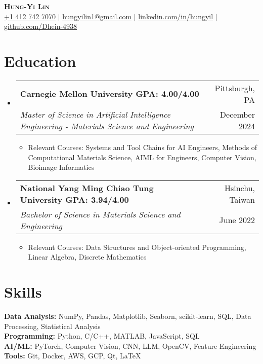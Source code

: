 \documentclass[a4paper,11pt]{article}
\makeatletter
\newcommand{\resumeItem}[1]{
  \item\small{
    {#1 \vspace{-2pt}}
  }
}
\newcommand{\resumeDoubleHeading}[4]{
  \vspace{-2pt}\item
    \begin{tabular*}{0.97\textwidth}[t]{l@{\extracolsep{\fill}}r}
        \textbf{#1} & #2 \\
        \textit{\small#3} & {\small #4} \\
    \end{tabular*}\vspace{-5pt}
}
\newcommand{\resumeSubHeadingListStart}{\begin{itemize}[leftmargin=0.15in, label={}]}
\newcommand{\resumeSubHeadingListEnd}{\end{itemize}}
\makeatother
\begin{document}

\begin{center}
    \textbf{\Huge \scshape Hung-Yi Lin} \\ \vspace{3pt}
    \small
    \faMobile \hspace{.5pt} \href{tel:14127427070}{+1 412 742 7070}
    $|$
    \faAt \hspace{.5pt} \href{mailto:hungyilin1@gmail.com}{hungyilin1@gmail.com}
    $|$
    \faLinkedinSquare \hspace{.5pt} \href{https://www.linkedin.com/in/hungyil}{linkedin.com/in/hungyil}
    $|$
    \faGithub \hspace{.5pt} \href{https://github.com/Dhein-4938}{github.com/Dhein-4938}
\end{center}



\section{Education}
\vspace{3pt}
\resumeSubHeadingListStart
    \resumeDoubleHeading
      {Carnegie Mellon University \textnormal{\small GPA: 4.00/4.00}}{Pittsburgh, PA}
      {Master of Science in Artificial Intelligence Engineering - Materials Science and Engineering}{December 2024}
    \resumeSubHeadingListStart
        \resumeItem{Relevant Courses: Systems and Tool Chains for AI Engineers, Methods of Computational Materials Science, AIML for Engineers, Computer Vision, Bioimage Informatics}
    \resumeSubHeadingListEnd
    \resumeDoubleHeading
      {National Yang Ming Chiao Tung University  \textnormal{\small GPA: 3.94/4.00}}{Hsinchu, Taiwan}
      {Bachelor of Science in Materials Science and Engineering}{June 2022}
    \resumeSubHeadingListStart
        \resumeItem{Relevant Courses: Data Structures and Object-oriented Programming, Linear Algebra, Discrete Mathematics}
    \resumeSubHeadingListEnd   
\resumeSubHeadingListEnd


\section{Skills}
  \vspace{2pt}
  \resumeSubHeadingListStart
    \small{\item{
        \textbf{Data Analysis:}{ NumPy, Pandas, Matplotlib, Seaborn, scikit-learn, SQL, Data Processing, Statistical Analysis} \\ 
        \vspace{3pt}
        \textbf{Programming:}{ Python, C/C++, MATLAB, JavaScript, SQL} \\ 
        \vspace{3pt}
        \textbf{AI/ML:}{ PyTorch, Computer Vision, CNN, LLM, OpenCV, Feature Engineering } \\
        \vspace{3pt}
        \textbf{Tools:}{ Git, Docker, AWS, GCP, Qt, LaTeX } \\
    }}
  \resumeSubHeadingListEnd
\end{document}
